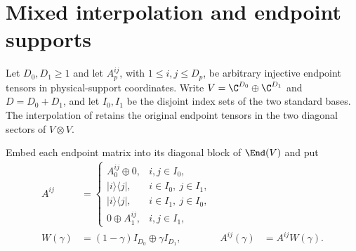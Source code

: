 
\section{Mixed interpolation and endpoint supports}
\label{sec:mpo_mixed_endpoints}

Let $D_0,D_1\geq1$ and let $A_p^{ij}$, with $1\leq i,j\leq D_p$,
be arbitrary injective endpoint tensors in physical-support coordinates.
Write $V=\C^{D_0}\oplus\C^{D_1}$ and $D=D_0+D_1$, and let $I_0,I_1$
be the disjoint index sets of the two standard bases.
The interpolation of \cite[Section~5]{GarreRubio2023MPOSym} retains the
original endpoint tensors in the two diagonal sectors of $V\otimes V$.

\begin{definition}
    \label{def:mpo_mixed_endpoint_tensor}
    \leanok
    Embed each endpoint matrix into its diagonal block of $\End(V)$ and put
    \begin{align}
        A^{ij}    & =
        \begin{cases}
            A_0^{ij}\oplus0,     & i,j\in I_0,          \\
            |i\rangle\langle j|, & i\in I_0,\ j\in I_1, \\
            |i\rangle\langle j|, & i\in I_1,\ j\in I_0, \\
            0\oplus A_1^{ij},    & i,j\in I_1,
        \end{cases}
        \label{eq:mpo_mixed_letters}                                            \\
        W(\gamma) & =(1-\gamma)I_{D_0}\oplus\gamma I_{D_1},
                  & A^{ij}(\gamma)                          & =A^{ij}W(\gamma).
        \label{eq:mpo_mixed_weight}
    \end{align}
\end{definition}

